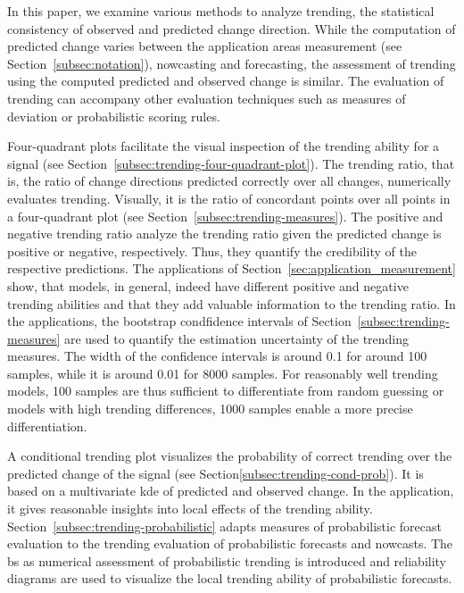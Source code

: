 
In this paper, we examine various methods to analyze trending, the statistical consistency of observed and predicted change direction.
While the computation of predicted change varies between the application areas measurement (see Section~\ref{subsec:notation}), nowcasting and forecasting, the assessment of trending using the computed predicted and observed change is similar.
The evaluation of trending can accompany other evaluation techniques such as measures of deviation or probabilistic scoring rules.

Four-quadrant plots facilitate the visual inspection of the trending ability for a signal (see Section~\ref{subsec:trending-four-quadrant-plot}).
The trending ratio, that is, the ratio of change directions predicted correctly over all changes, numerically evaluates trending.
Visually, it is the ratio of concordant points over all points in a four-quadrant plot (see Section~\ref{subsec:trending-measures}).
The positive and negative trending ratio analyze the trending ratio given the predicted change is positive or negative, respectively.
Thus, they quantify the credibility of the respective predictions. 
The applications of Section~\ref{sec:application_measurement} show, that models, in general, indeed have different positive and negative trending abilities and that they add valuable information to the trending ratio.
In the applications, the bootstrap condfidence intervals of Section~\ref{subsec:trending-measures} are used to quantify the estimation uncertainty of the trending measures.
The width of the confidence intervals is around 0.1 for around 100 samples, while it is around 0.01 for 8000 samples.
For reasonably well trending models, 100 samples are thus sufficient to differentiate from random guessing or models with high trending differences, 1000 samples enable a more precise differentiation.

A conditional trending plot visualizes the probability of correct trending over the predicted change of the signal (see Section\ref{subsec:trending-cond-prob}).
It is based on a multivariate \acf{kde} of predicted and observed change.
In the application, it gives reasonable insights into local effects of the trending ability.
Section~\ref{subsec:trending-probabilistic} adapts measures of probabilistic forecast evaluation to the trending evaluation of probabilistic forecasts and nowcasts.
The \acf{bs} as numerical assessment of probabilistic trending is introduced and reliability diagrams are used to visualize the local trending ability of probabilistic forecasts.

